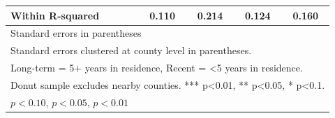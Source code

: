\begin{table}[htbp]
\begin{tabular}{l*{4}{c}}
Within R-squared&       0.110         &       0.214         &       0.124         &       0.160         \\
\hline\hline
\multicolumn{5}{l}{\footnotesize Standard errors in parentheses}\\
\multicolumn{5}{l}{\footnotesize Standard errors clustered at county level in parentheses.}\\
\multicolumn{5}{l}{\footnotesize Long-term = 5+ years in residence, Recent = <5 years in residence.}\\
\multicolumn{5}{l}{\footnotesize Donut sample excludes nearby counties. *** p<0.01, ** p<0.05, * p<0.1.}\\
\multicolumn{5}{l}{\footnotesize \sym{*} \(p<0.10\), \sym{**} \(p<0.05\), \sym{***} \(p<0.01\)}\\
\end{tabular}
\end{table}
